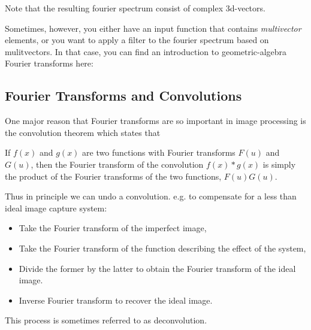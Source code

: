 Note that the resulting fourier spectrum consist of complex 3d-vectors.

Sometimes, however, you either have an input function that contains \emph{multivector} elements, or you want to apply a filter to the fourier spectrum based on mulitvectors. In that case, you can find an introduction to geometric-algebra Fourier transforms here: 



\subsection{Fourier Transforms and Convolutions}
One major reason that Fourier transforms are so important in image processing is the convolution theorem which states that

If $f(x)$ and $g(x)$ are two functions with Fourier transforms $F(u)$ and $G(u)$, then the Fourier transform of the convolution $f(x)*g(x)$ is simply the product of the Fourier transforms of the two functions, $F(u) G(u)$.

Thus in principle we can undo a convolution. e.g. to compensate for a less than ideal image capture system:

\begin{itemize}
	\item Take the Fourier transform of the imperfect image,
	\item Take the Fourier transform of the function describing the effect of the system,
	\item Divide the former by the latter to obtain the Fourier transform of the ideal image.
	\item Inverse Fourier transform to recover the ideal image.
\end{itemize}
This process is sometimes referred to as deconvolution.

